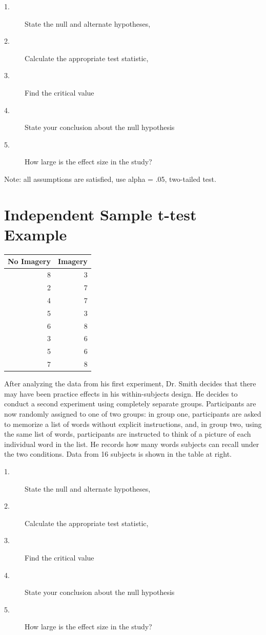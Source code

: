 \documentclass{tufte-handout}
\begin{document}
\begin{description}
\item[1.] State the null and alternate hypotheses, 
\item[2.] Calculate the appropriate test statistic, 
\item[3.] Find the critical value 
\item[4.] State your conclusion about the null hypothesis 
\item[5.] How large is the effect size in the study?
\end{description}

Note: all assumptions are satisfied, use alpha = .05, two-tailed test.

\pagebreak
\section{Independent Sample t-test Example}

\begin{margintable}[20pt]
  \selectfont
  \begin{tabular}{rr}
    \toprule
No Imagery & Imagery\\
    \midrule
8&	3\\
2&	7\\
4&	7\\
5&	3\\
6&	8\\
3&	6\\
5&	6\\
7&	8\\
    \bottomrule
  \end{tabular}
  \label{tab:normaltab}
\end{margintable}

After analyzing the data from his first experiment, Dr. Smith decides that there may have been practice effects in his within-subjects design. He decides to conduct a second experiment using completely separate groups. Participants are now randomly assigned to one of two groups: in group one, participants are asked to memorize a list of words without explicit instructions, and, in group two, using the same list of words, participants are instructed to think of a picture of each individual word in the list. He records how many words subjects can recall under the two conditions. Data from 16 subjects is shown in the table at right.

\begin{description}
\item[1.] State the null and alternate hypotheses, 
\item[2.] Calculate the appropriate test statistic, 
\item[3.] Find the critical value 
\item[4.] State your conclusion about the null hypothesis 
\item[5.] How large is the effect size in the study?
\end{description}
\end{document}
